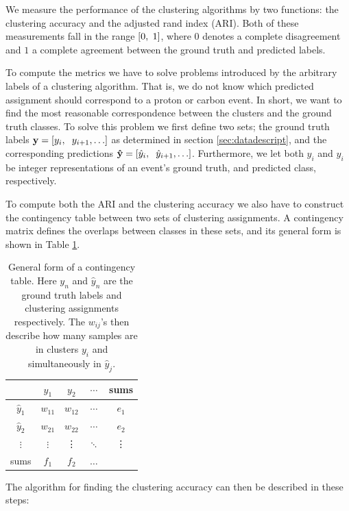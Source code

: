 \documentclass[preprint,12pt]{elsarticle}
\begin{document}
We measure the performance of the clustering algorithms by two functions: the clustering accuracy and the adjusted rand index (ARI)\cite{Hubert1985}. Both of these measurements fall in the range $ [0, \hspace{0.1cm}1]$, where $0$ denotes a complete disagreement and $1$ a complete agreement between the ground truth and predicted labels.

To compute the metrics we have to solve problems introduced by the arbitrary labels of a clustering algorithm. That is, we do not know which predicted assignment should correspond to a proton or carbon event. In short, we want to find the most reasonable correspondence between the clusters and the ground truth classes. To solve this problem we first define two sets; the ground truth labels $\mathbf{y} = [y_i, \hspace{0.2cm} y_{i +1}, \ldots]$ as determined in section \ref{sec:datadescript}, and the corresponding predictions $\mathbf{\hat{y}} = [\hat{y}_i, \hspace{0.2cm} \hat{y}_{i +1}, \ldots]$. Furthermore, we let both $y_i$ and $\hat{y}_i$ be integer representations of an event's ground truth, and predicted class, respectively. 

To compute both the ARI and the clustering accuracy we also have to construct the contingency table between two sets of clustering assignments. A contingency matrix defines the overlaps between classes in these sets, and its general form is shown in Table \ref{tab:contingency}.

\begin{table}[H]
\centering
\caption{General form of a contingency table. Here $y_n$ and $\hat{y}_n$ are the ground truth labels and clustering assignments respectively. The $w_{ij}$'s then describe how many samples are in clusters $y_i$ and simultaneously in $\hat{y}_j$.}\label{tab:contingency}
\begin{tabular}{c|ccc|c}
& $y_1$ &$y_2$ & $\cdots$ & sums \\
\midrule
$\hat{y}_1$ & $w_{11}$ & $w_{12}$ &  $\cdots$ & $e_1$ \\
$\hat{y}_2$ & $w_{21}$ & $w_{22}$ &  $\cdots$ & $e_2$\\
$\vdots$ & $\vdots$ & \vdots & $\ddots$ & \vdots \\
\hline
sums & $f_1$ & $f_2$ & $\hdots$ 
\end{tabular}
\end{table}

The algorithm for finding the clustering accuracy can then be described in these steps: 
\end{document}
